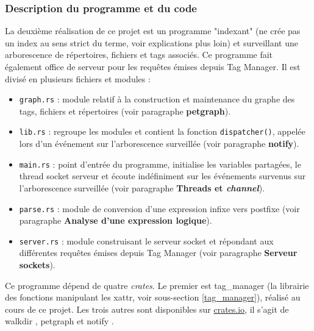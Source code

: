 \subsubsection{Description du programme et du code}
La deuxième réalisation de ce projet est un programme "indexant" (ne crée pas un index au sens 
strict du terme, voir explications plus loin) et surveillant une arborescence de 
répertoires, fichiers et tags associés. Ce programme fait également office de serveur pour les 
requêtes émises depuis Tag Manager. Il est divisé en plusieurs fichiers et modules :
\begin{itemize}
    \item \texttt{graph.rs} : module relatif à la construction et 
        maintenance du graphe des tags, fichiers et répertoires (voir paragraphe \textbf{petgraph}).
    \item \texttt{lib.rs} : regroupe les modules et contient la fonction 
        \texttt{dispatcher()}, appelée lors d'un événement sur l'arborescence surveillée 
        (voir paragraphe \textbf{notify}).
    \item \texttt{main.rs} : point d'entrée du programme, initialise les variables 
        partagées, le thread socket serveur et écoute indéfiniment sur les événements survenus 
        sur l'arborescence surveillée (voir paragraphe \textbf{Threads et \textit{channel}}).
    \item \texttt{parse.rs} : module de conversion d'une expression infixe vers postfixe 
        (voir paragraphe \textbf{Analyse d'une expression logique}).
    \item \texttt{server.rs} : module construisant le serveur socket et répondant 
        aux différentes requêtes émises depuis Tag Manager (voir paragraphe \textbf{Serveur sockets}).
\end{itemize}
Ce programme dépend de quatre \textit{crates}. Le premier est 
tag\_manager (la librairie des fonctions manipulant les \acrshort{xattr}, voir sous-section \ref{tag_manager}), 
réalisé au cours de ce projet. Les trois autres sont disponibles sur \href{https://crates.io}{crates.io}, 
il s'agit de walkdir \cite{ref43}, petgraph \cite{ref44} et notify \cite{ref45}.

